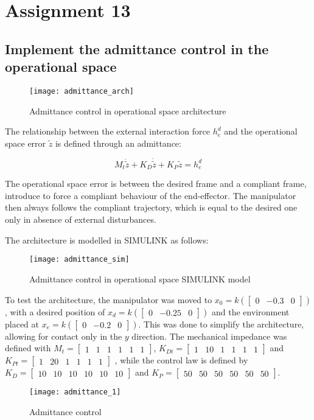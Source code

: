 \section{Assignment 13}

\subsection{Implement the admittance control in the operational space}

\begin{figure}[H]
\centering
\texttt{[image: admittance\_arch]}
\caption{Admittance control in operational space architecture}
\end{figure}

The relationship between the external interaction force $h_e^d$ and the operational space error $\tilde z$ is defined through an admittance:

\begin{equation*}
M_t\ddot{\tilde z}+K_D\dot{\tilde z}+K_P\tilde z = h_e^d
\end{equation*}

The operational space error is between the desired frame and a compliant frame, introduce to force a compliant behaviour of the end-effector. The manipulator then always follows the compliant trajectory, which is equal to the desired one only in absence of external disturbances.

The architecture is modelled in SIMULINK as follows:

\begin{figure}[H]
\centering
\texttt{[image: admittance\_sim]}
\caption{Admittance control in operational space SIMULINK model}
\end{figure}

To test the architecture, the manipulator was moved to $x_0=k(\begin{bmatrix}
0&-0.3&0
\end{bmatrix})$, with a desired position of $x_d=k(\begin{bmatrix}
0&-0.25&0
\end{bmatrix})$ and the environment placed at $x_e=k(\begin{bmatrix}
0&-0.2&0
\end{bmatrix})$. This was done to simplify the architecture, allowing for contact only in the $y$ direction. The mechanical impedance was defined with $M_t=\begin{bmatrix}
1 & 1 & 1 & 1 & 1 & 1
\end{bmatrix}$, $K_{Dt}=\begin{bmatrix}
1 & 10 & 1 & 1 & 1 & 1
\end{bmatrix}$ and $K_{Pt}=\begin{bmatrix}
1 & 20 & 1 & 1 & 1 & 1
\end{bmatrix}$ , while the control law is defined by $K_D=\begin{bmatrix}
10 & 10 & 10 & 10 & 10 & 10
\end{bmatrix}$ and $K_P=\begin{bmatrix}
50 & 50 & 50 & 50 & 50 & 50
\end{bmatrix}$.


\newpage

\begin{figure}[H]
\centering
\texttt{[image: admittance\_1]}
\caption{Admittance control}
\end{figure}